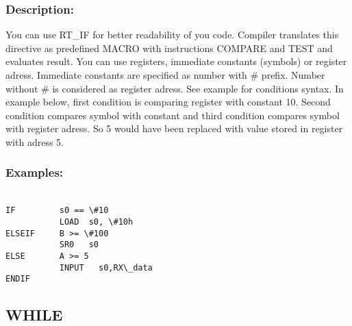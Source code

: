 {        \subsubsection{Description:}
        You can use RT\_IF for better readability of you code. Compiler translates this directive as predefined MACRO with instructions COMPARE and TEST and
        evaluates result. You can use registers, immediate constants (symbols) or register adress. Immediate constants are specified as number with \# prefix.
        Number without \# is considered as register adress. See example for conditions syntax. In example below, first condition is comparing register with constant 10. Second condition compares symbol with constant and third condition compares
        symbol with register adress. So 5 would have been replaced with value stored in register with adress 5.
        \subsubsection{Examples:}
        {
            ~\\
            \usecodefont
            \verb'IF         s0 == \#10'\\
            \verb'           LOAD  s0, \#10h'\\
            \verb'ELSEIF     B >= \#100'\\
            \verb'           SR0   s0'\\
            \verb'ELSE       A >= 5'\\
            \verb'           INPUT   s0,RX\_data'\\
            \verb'ENDIF'
        }
       
    \subsection{WHILE}
}
